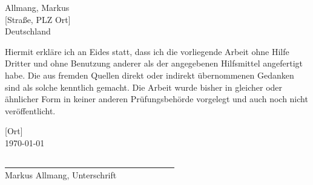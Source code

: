 \newpage



\text{ }
\vspace{2.0cm}


Allmang, Markus\\{}
{[Stra{\ss}e, PLZ Ort]}\\
Deutschland
\vspace{1.0cm}

\glqq Hiermit erkl\"are ich an Eides statt, dass ich die vorliegende Arbeit ohne Hilfe Dritter und ohne
Benutzung anderer als der angegebenen Hilfsmittel angefertigt habe. Die aus fremden Quellen
direkt oder indirekt \"ubernommenen Gedanken sind als solche kenntlich gemacht. Die Arbeit
wurde bisher in gleicher oder \"ahnlicher Form in keiner anderen Pr\"ufungsbeh\"orde vorgelegt
und auch noch nicht ver\"offentlicht.\grqq

{[Ort]}\\
\today
\medskip
\medskip



\underline{~~~~~~~~~~~~~~~~~~~~~~~~~~~~~~~~~~~~~~~~}\\
Markus Allmang, Unterschrift



\newpage

\setcounter{page}{3}
